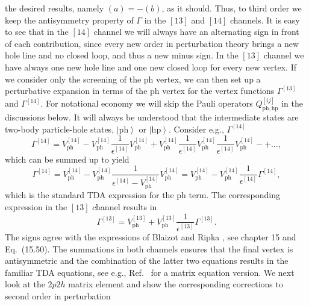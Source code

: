the desired results, namely $(a)=-(b)$, as it should.
Thus, to third order we keep the antisymmetry property of 
$\Gamma$ in the $[13]$ and $[14]$ channels.
It is easy to see that in the $[14]$ channel we will always
have an alternating sign in front of each contribution, 
since every new order in perturbation theory brings a new hole
line and no closed loop, and thus a new minus sign.
In the $[13]$ channel we have always one new hole line and
one new closed loop for every new vertex. 
If we consider only the screening of the ph vertex, we can then set up
a perturbative expansion in terms of the ph vertex for the 
vertex functions $\Gamma^{[13]}$ and $\Gamma^{[14]}$. 
For notational economy we will skip the Pauli operators
$Q_{\mathrm{ph,hp}}^{[ij]}$ in the discussions below.
It will always be understood that the intermediate states
are two-body particle-hole states, $\left| \mathrm{ph}\right\rangle$ or
$\left| \mathrm{hp}\right\rangle$. 
Consider e.g.,
$\Gamma^{[14]}$ 
\begin{equation}
       \Gamma^{[14]}=V^{[14]}_{\mathrm{ph}}-
        V^{[14]}_{\mathrm{ph}}
        \frac{1}{\epsilon^{[14]}}
        V_{\mathrm{ph}}^{[14]}+
        V^{[14]}_{\mathrm{ph}}
        \frac{1}{\epsilon^{[14]}}
        V^{[14]}_{\mathrm{ph}}
        \frac{1}{\epsilon^{[14]}}
        V^{[14]}_{\mathrm{ph}}-+\dots,
\end{equation}
which can be summed up to yield 
\begin{equation}
  \Gamma^{[14]}=V^{[14]}_{\mathrm{ph}}-
   V^{[14]}_{\mathrm{ph}}
   \frac{1}
   {\epsilon^{[14]}-V^{[14]}_{\mathrm{ph}}}
   V^{[14]}_{\mathrm{ph}}=
   V^{[14]}_{\mathrm{ph}}-
   V^{[14]}_{\mathrm{ph}}
   \frac{1}{\epsilon^{[14]}}\Gamma^{[14]},
   \label{eq:screening1}
\end{equation}
which is the standard TDA expression for the ph term.
The corresponding expression in the $[13]$ channel 
results in
\begin{equation}
  \Gamma^{[13]}=V^{[13]}_{\mathrm{ph}}+
   V^{[13]}_{\mathrm{ph}}
   \frac{1}{\epsilon^{[13]}}\Gamma^{[13]}.
\end{equation}
The signs agree with the 
expressions of Blaizot and Ripka \cite{br86}, see chapter 15 and
Eq.\ (15.50).
The summations in both channels ensures that the final vertex
is antisymmetric and the combination of 
the latter two equations results in the familiar
TDA equations, see e.g., Ref.\ \cite{kt94} for a matrix equation
version. 
We next look at the $2p2h$ matrix element and show the
corresponding corrections to second order in perturbation
